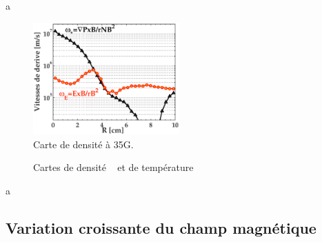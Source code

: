\begin{refsection}
a
\begin{figure}[htbp]
\centering
\includegraphics[width=0.5\textwidth]{figures/4-CybeleProfileVitessesDerive.eps}
{\caption{Carte de densité à 35G.}
\label{4-CybeleVitessesDerive}}
\end{figure}


\begin{figure}[htbp]
  \centering
    \caption{Cartes de densité ~ et de
    température }
    \label{pandas}
\end{figure}

a

\subsection{Variation croissante du champ magnétique}


\end{refsection}
